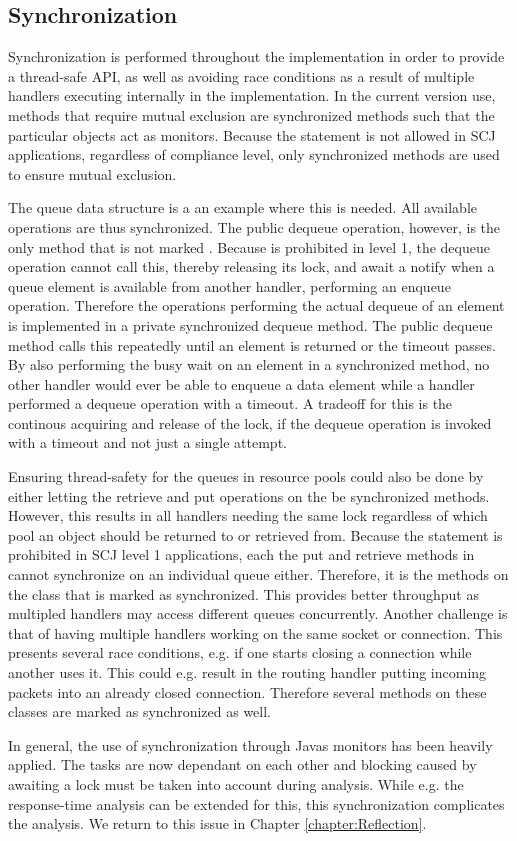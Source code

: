\subsection{Synchronization} %
\label{sub:synchronization}
Synchronization is performed throughout the implementation in order to provide a thread-safe API, as well as avoiding race conditions as a result of multiple handlers executing internally in the implementation. In the current version use, methods that require mutual exclusion are synchronized methods such that the particular objects act as monitors. Because the  statement is not allowed in SCJ applications, regardless of compliance level, only synchronized methods are used to ensure mutual exclusion.

The queue data structure is a an example where this is needed. All available operations are thus synchronized. The public dequeue operation, however, is the only method that is not marked . Because  is prohibited in level 1, the dequeue operation cannot call this, thereby releasing its lock, and await a notify  when a queue element is available from another handler, performing an enqueue operation. Therefore the operations performing the actual dequeue of an element is implemented in a private synchronized dequeue method. The public dequeue method calls this repeatedly until an element is returned or the timeout passes. By also performing the busy wait on an element in a synchronized method, no other handler would ever be able to enqueue a data element while a handler performed a dequeue operation with a timeout. A tradeoff for this is the continous acquiring and release of the lock, if the dequeue operation is invoked with a timeout and not just a single attempt.

Ensuring thread-safety for the queues in resource pools could also be done by either letting the retrieve and put operations on the  be synchronized methods. However, this results in all handlers needing the same lock regardless of which pool an object should be returned to or retrieved from. Because the  statement is prohibited in SCJ level 1 applications, each the put and retrieve methods in  cannot synchronize on an individual queue either. Therefore, it is the methods on the  class that is marked as synchronized. This provides better throughput as multipled handlers may access different queues concurrently. Another challenge is that of having multiple handlers working on the same socket or connection. This presents several race conditions, e.g. if one starts closing a connection while another uses it. This could e.g. result in the routing handler putting incoming packets into an already closed connection. Therefore several methods on these classes are marked as synchronized as well.

In general, the use of synchronization through Javas monitors has been heavily applied. The tasks are now dependant on each other and blocking caused by awaiting a lock must be taken into account during analysis. While e.g. the response-time analysis can be extended for this\cite{alan2001real}, this synchronization complicates the analysis. We return to this issue in Chapter \ref{chapter:Reflection}.